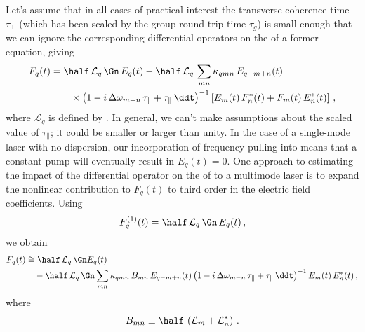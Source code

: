  Let's assume that in all cases of practical interest the transverse coherence time $\tau_\perp$ (which has been scaled by the group round-trip time $\tau_g$) is small enough that we can ignore the corresponding differential operators on the \rhs of a former equation, giving
 \begin{equation} \label{eqn:mll_swl_fqt_prac}
 \begin{split}
F_q(t) &= \half\, \mathcal{L}_q\, \Gn\, E_q(t) - \half\, \mathcal{L}_q\, \sum_{m n} \kappa_{q m n}\, E_{q - m + n}(t) \\
&\qquad \times \left(1 - i\, \Delta \omega_{m - n} \, \tau_\parallel + \tau_\parallel\, \ddt\right)^{-1} \left[ E_m(t)\, F_n^\ast(t) + F_m(t)\, E_n^\ast(t) \right]\, ,
 \end{split}
 \end{equation}
where $\mathcal{L}_{q}$ is defined by .
In general, we can't make assumptions about the scaled value of $\tau_\parallel$; it could be smaller or larger than unity. In the case of a single-mode laser with no dispersion, our incorporation of frequency pulling into  means that a constant pump will eventually result in $\dot{E}_q(t) = 0$. One approach to estimating the impact of the differential operator on the \rhs of  to a multimode laser is to expand the nonlinear contribution to $F_q(t)$ to third order in the electric field coefficients. Using
 \begin{equation}
F^{(1)}_q(t) = \half\, \mathcal{L}_q\, \Gn\, E_q(t)\, ,
 \end{equation}
we obtain
 \begin{equation} \label{eqn:mll_swl_fqt_fwm_prac}
 \begin{split}
F_q(t) &\cong \half\, \mathcal{L}_q\, \Gn E_q(t) \\
&\quad - \half\, \mathcal{L}_q\, \Gn \sum_{m n} \kappa_{q m n}\, B_{m n}\, E_{q - m + n}(t) \left(1 - i\, \Delta \omega_{m - n} \, \tau_\parallel + \tau_\parallel\, \ddt\right)^{-1} E_m(t)\, E_n^\ast(t)\, ,
 \end{split}
 \end{equation}
where
 \begin{equation} \label{eqn:mll_1d_b_def}
B_{m n} \equiv \half\, \left( \mathcal{L}_m + \mathcal{L}^\ast_n \right)\, .
 \end{equation}
